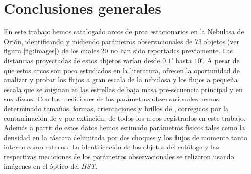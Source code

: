 %


%

\label{chap:conclu}

\section{Conclusiones generales}
\label{sec:con-g}

En este trabajo hemos catalogado arcos de proa estacionarios en la Nebulosa de Orión, identificando y  midiendo  parámetros observacionales de 73 objetos (ver figura \ref{fig:images}) de los cuales 20 no han sido reportados previamente. Las distancias proyectadas de estos objetos varían desde \(0.1'\) hasta \(10'\). A pesar de que estos arcos son poco estudiados en la literatura, ofrecen la oportunidad de analizar y probar los flujos a gran escala de la nebulosa y los flujos a pequeña escala que se originan en las estrellas de baja masa pre-secuencia principal y en sus discos. Con las mediciones de los parámetros observacionales hemos determinado tamaños, formas, orientaciones y brillos de \ha{}, corregidos por la contaminación de \nii{} y por extinción, de todos los arcos registrados en este trabajo. Además a partir de estos datos hemos estimado parámetros físicos tales como la  densidad en la cáscara  delimitada por dos choques y los flujos de momento tanto interno como externo. La identificación de los objetos del catálogo y las respectivas mediciones de los parámetros observacionales se relizaron usando imágenes en el óptico del \textit{HST}.\\

